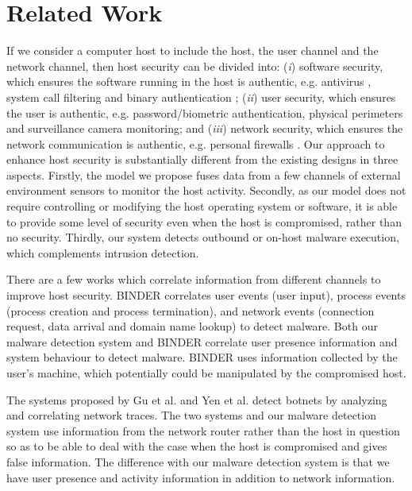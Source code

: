 \section{Related Work}
\label{sec:sensor-related}

If we consider a computer host to include the host, the user channel
and the network channel, then host security can be divided into:
({\it i}) software security, which ensures the software running in
the host is authentic, e.g. antivirus \cite{post1998use}, system call
filtering \cite{provos2003improving} and binary authentication \cite{halim2008lightweight};
({\it ii}) user security, which ensures the user is authentic, e.g.
password/biometric authentication, physical perimeters and
surveillance camera monitoring; and ({\it iii}) network security,
which ensures the network communication is authentic, e.g. personal
firewalls \cite{ingham2002history}. Our approach to enhance host
security is substantially different from the existing designs in
three aspects. Firstly, the model we propose fuses data from a few
channels of external environment sensors to monitor the host
activity. Secondly, as our model does not require controlling or
modifying the host operating system or software, it is able to provide some
level of security even when the host is compromised, rather than no security. 
Thirdly, our system
detects outbound or on-host malware execution, which complements
intrusion detection.

There are a few works which correlate information from different
channels to improve host security. BINDER \cite{cui2005design}
correlates user events (user input), process events (process
creation and process termination), and network events (connection
request, data arrival and domain name lookup) to detect malware.
Both our malware detection system and BINDER correlate user presence
information and system behaviour to detect malware. BINDER uses
information collected by the user's machine, which potentially could
be manipulated by the compromised host.

The systems proposed by Gu et al. \cite{gu2007bothunter} and Yen et al.
\cite{yen2008traffic} detect botnets by analyzing and correlating network
traces. The two systems and our malware detection system use
information from the network router rather than the host in question
so as to be able to deal with the case when the host is compromised
and gives false information. The difference with our malware
detection system is that we have user presence and activity
information in addition to network information.

